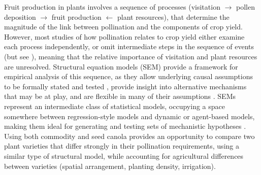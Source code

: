 \documentclass[12pt]{article} %
\begin{document}

Fruit production in plants involves a sequence of processes (visitation $\rightarrow$ pollen deposition $\rightarrow$ fruit production $\leftarrow$ plant resources), that determine the magnitude of the link between pollination and the components of crop yield.
However, most studies of how pollination relates to crop yield either examine each process independently, or omit intermediate steps in the sequence of events (but see \citealp{saez2018}), meaning that the relative importance of visitation and plant resources are unresolved.
Structural equation models (SEM) provide a framework for empirical analysis of this sequence, as they allow underlying causal assumptions to be formally stated and tested \citep{shipley2009, grace2012}, provide insight into alternative mechanisms that may be at play, and are flexible in many of their assumptions \citep{clough2012}.
SEMs represent an intermediate class of statistical models, occupying a space somewhere between regression-style models and dynamic or agent-based models, making them ideal for generating and testing sets of mechanistic hypotheses \citep{grace2006, kline2013}. 
Using both commodity and seed canola provides an opportunity to compare two plant varieties that differ strongly in their pollination requirements, using a similar type of structural model, while accounting for agricultural differences between varieties (spatial arrangement, planting density, irrigation).
\end{document}
